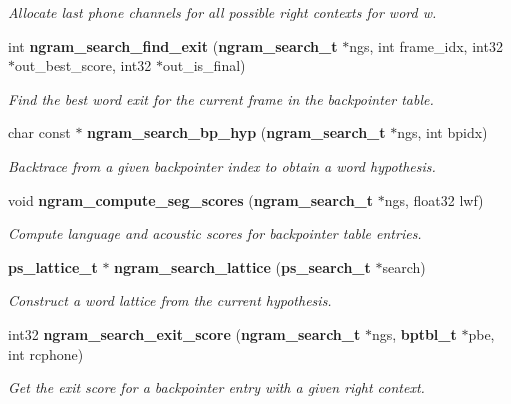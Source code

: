 \begin{DoxyCompactItemize}
\begin{DoxyCompactList}\small\item\em Allocate last phone channels for all possible right contexts for word w. \end{DoxyCompactList}\item 
int {\bf ngram\-\_\-search\-\_\-find\-\_\-exit} ({\bf ngram\-\_\-search\-\_\-t} $\ast$ngs, int frame\-\_\-idx, int32 $\ast$out\-\_\-best\-\_\-score, int32 $\ast$out\-\_\-is\-\_\-final)
\begin{DoxyCompactList}\small\item\em Find the best word exit for the current frame in the backpointer table. \end{DoxyCompactList}\item 
char const $\ast$ {\bf ngram\-\_\-search\-\_\-bp\-\_\-hyp} ({\bf ngram\-\_\-search\-\_\-t} $\ast$ngs, int bpidx)
\begin{DoxyCompactList}\small\item\em Backtrace from a given backpointer index to obtain a word hypothesis. \end{DoxyCompactList}\item 
void {\bf ngram\-\_\-compute\-\_\-seg\-\_\-scores} ({\bf ngram\-\_\-search\-\_\-t} $\ast$ngs, float32 lwf)\label{ngram__search_8h_a2fa760c99f77eb075157304f4359941e}

\begin{DoxyCompactList}\small\item\em Compute language and acoustic scores for backpointer table entries. \end{DoxyCompactList}\item 
{\bf ps\-\_\-lattice\-\_\-t} $\ast$ {\bf ngram\-\_\-search\-\_\-lattice} ({\bf ps\-\_\-search\-\_\-t} $\ast$search)\label{ngram__search_8h_ac30e7dec4bbfeee9f5163abf4bbd1014}

\begin{DoxyCompactList}\small\item\em Construct a word lattice from the current hypothesis. \end{DoxyCompactList}\item 
int32 {\bf ngram\-\_\-search\-\_\-exit\-\_\-score} ({\bf ngram\-\_\-search\-\_\-t} $\ast$ngs, {\bf bptbl\-\_\-t} $\ast$pbe, int rcphone)\label{ngram__search_8h_a25a80e488425b2bd4e24eb753c9295a5}

\begin{DoxyCompactList}\small\item\em Get the exit score for a backpointer entry with a given right context. \end{DoxyCompactList}\end{DoxyCompactItemize}



